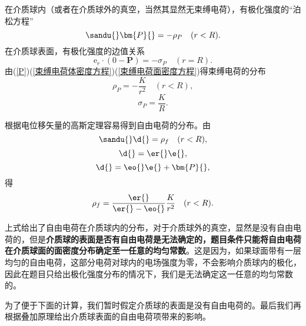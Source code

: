 

    
    在介质球内（或者在介质球外的真空，当然其显然无束缚电荷），有极化强度的“泊松方程”
    \begin{equation}
        \sandu{}\bm{P}{} = -\rho_P \quad (r<R).\label{束缚电荷体密度方程}
    \end{equation}
    在介质球表面，有极化强度的边值关系
    \begin{equation}
        \bm{\mathrm{e}}_r\cdot(0-\bm{P})=-\sigma_P \quad (r=R).\label{束缚电荷面密度方程}
    \end{equation}
    由(\ref{P})(\ref{束缚电荷体密度方程})(\ref{束缚电荷面密度方程})得束缚电荷的分布
    \begin{equation}
        \rho_P = -\frac{K}{r^2}\quad (r<R),\label{束缚电荷体密度}
    \end{equation}
    \begin{equation}
        \sigma_P = \frac{K}{R}.\label{束缚电荷面密度}
    \end{equation}        

    根据电位移矢量的高斯定理容易得到自由电荷的分布。由
    \begin{equation}
        \sandu{}\d{} = \rho_f \quad(r<R),
    \end{equation}
    \begin{equation}
        \d{} = \er{}\e{},
        \label{7}
    \end{equation}
    \begin{equation}
        \d{}=\eo{}\e{}+\bm{P}{},\label{8}
    \end{equation}
    得
    \begin{equation}
        \rho_f = \frac{\er{}}{\er{}-\eo{}}\frac{K}{r^2} \quad(r<R).
    \end{equation}
    
    上式给出了自由电荷在介质球内的分布，对于介质球外的真空，显然是没有自由电荷的，但是\textbf{介质球的表面是否有自由电荷是无法确定的，题目条件只能将自由电荷在介质球面的面密度分布确定至一任意的均匀常数}。这是因为，如果球面带有一层均匀的自由电荷，这部分电荷对球内的电场强度为零，不会影响介质球内的极化，因此在题目只给出极化强度分布的情况下，我们是无法确定这一任意的均匀常数的。
    
    为了便于下面的计算，我们暂时假定介质球的表面是没有自由电荷的。最后我们再根据叠加原理给出介质球表面的自由电荷项带来的影响。
    
